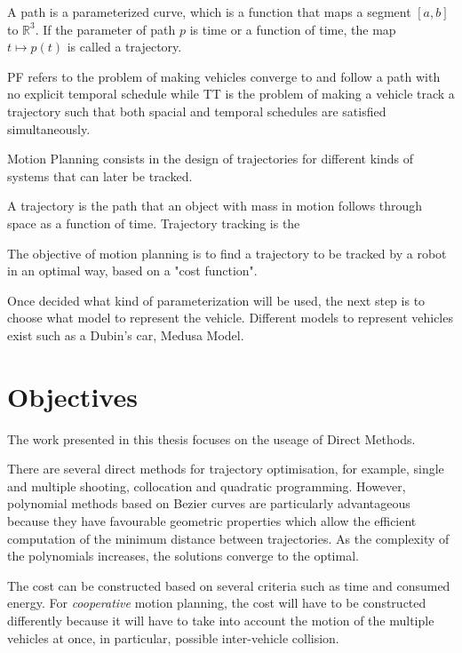 \par A path is a parameterized curve, which is a function that maps a segment $[a,b]$ to $\mathbb{R}^3$. If the parameter of path $p$ is time or a function of time, the map $t\mapsto p(t)$ is called a trajectory.
\par \ac{PF} refers to the problem of making vehicles converge to and follow a path with no explicit temporal schedule while \ac{TT} is the problem of making a vehicle track a trajectory such that both spacial and temporal schedules are satisfied simultaneously.
\par Motion Planning consists in the design of trajectories for different kinds of systems that can later be tracked.
\par A trajectory is the path that an object with mass in motion follows through space as a function of time. Trajectory tracking is the 
\par The objective of motion planning is to find a trajectory to be tracked by a robot in an optimal way, based on a "cost function".

\par Once decided what kind of parameterization will be used, the next step is to choose what model to represent the vehicle. Different models to represent vehicles exist such as a Dubin's car, Medusa Model.



\section{Objectives}


\par The work presented in this thesis focuses on the useage of Direct Methods.
\par There are several direct methods for trajectory optimisation, for example, single and multiple shooting, collocation and quadratic programming. However, polynomial methods based on Bezier curves are particularly advantageous because they have favourable geometric properties which allow the efficient computation of the minimum distance between trajectories. As the complexity of the polynomials increases, the solutions converge to the optimal.
\par The cost can be constructed based on several criteria such as time and consumed energy. For \textit{cooperative} motion planning, the cost will have to be constructed differently because it will have to take into account the motion of the multiple vehicles at once, in particular, possible inter-vehicle collision.

